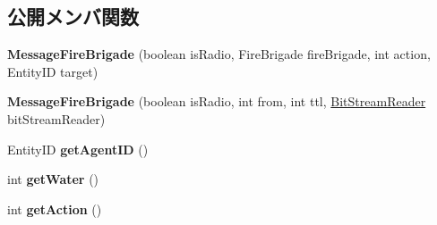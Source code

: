 \subsection*{公開メンバ関数}
\begin{DoxyCompactItemize}
\item 
\hypertarget{classadf_1_1agent_1_1communication_1_1standard_1_1bundle_1_1information_1_1MessageFireBrigade_a8ca53c7d1ab972720c03f53ee6eb018c}{}\label{classadf_1_1agent_1_1communication_1_1standard_1_1bundle_1_1information_1_1MessageFireBrigade_a8ca53c7d1ab972720c03f53ee6eb018c} 
{\bfseries Message\+Fire\+Brigade} (boolean is\+Radio, Fire\+Brigade fire\+Brigade, int action, Entity\+ID target)
\item 
\hypertarget{classadf_1_1agent_1_1communication_1_1standard_1_1bundle_1_1information_1_1MessageFireBrigade_ad32bcb9148c11b56deb5d815d70dab17}{}\label{classadf_1_1agent_1_1communication_1_1standard_1_1bundle_1_1information_1_1MessageFireBrigade_ad32bcb9148c11b56deb5d815d70dab17} 
{\bfseries Message\+Fire\+Brigade} (boolean is\+Radio, int from, int ttl, \hyperlink{classadf_1_1component_1_1communication_1_1util_1_1BitStreamReader}{Bit\+Stream\+Reader} bit\+Stream\+Reader)
\item 
\hypertarget{classadf_1_1agent_1_1communication_1_1standard_1_1bundle_1_1information_1_1MessageFireBrigade_adcaaf7589307c3a98c1ae64031cd0902}{}\label{classadf_1_1agent_1_1communication_1_1standard_1_1bundle_1_1information_1_1MessageFireBrigade_adcaaf7589307c3a98c1ae64031cd0902} 
Entity\+ID {\bfseries get\+Agent\+ID} ()
\item 
\hypertarget{classadf_1_1agent_1_1communication_1_1standard_1_1bundle_1_1information_1_1MessageFireBrigade_a417145b23aff282bb388376443e8347c}{}\label{classadf_1_1agent_1_1communication_1_1standard_1_1bundle_1_1information_1_1MessageFireBrigade_a417145b23aff282bb388376443e8347c} 
int {\bfseries get\+Water} ()
\item 
\hypertarget{classadf_1_1agent_1_1communication_1_1standard_1_1bundle_1_1information_1_1MessageFireBrigade_a5c6625085dcecd0c9e1f9664eff5fd28}{}\label{classadf_1_1agent_1_1communication_1_1standard_1_1bundle_1_1information_1_1MessageFireBrigade_a5c6625085dcecd0c9e1f9664eff5fd28} 
int {\bfseries get\+Action} ()
\item 
\hypertarget{classadf_1_1agent_1_1communication_1_1standard_1_1bundle_1_1information_1_1MessageFireBrigade_ae9d02ce7cb38cb6fc345002a49e222f1}{}\label{classadf_1_1agent_1_1communication_1_1standard_1_1bundle_1_1information_1_1MessageFireBrigade_ae9d02ce7cb38cb6fc345002a49e222f1} 

\end{DoxyCompactItemize}

